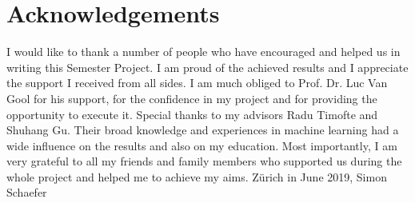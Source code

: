 \newpage
\section*{Acknowledgements}

I would like to thank a number of people who have encouraged and helped us in
writing this Semester Project. I am proud of the achieved results and I
appreciate the support I received from all sides.
\vspace{0.5cm}
\newline
I am much obliged to Prof. Dr. Luc Van Gool for his support, for the confidence
in my project and for providing the opportunity to execute it.
\vspace{0.5cm}
\newline
Special thanks to my advisors Radu Timofte and Shuhang Gu. Their broad knowledge
and experiences in machine learning had a wide influence on the results and
also on my education.
\vspace{0.5cm}
\newline
Most importantly, I am very grateful to all my friends and family members
who supported us during the whole project and helped me to achieve my aims.
\vspace{0.5cm}
\newline
Zürich in June 2019,
\newline
Simon Schaefer

